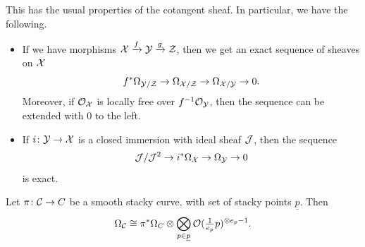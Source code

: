 \begin{rmk}
This has the usual properties of the cotangent sheaf. In particular, we have the following.
\begin{itemize}
	\item If we have morphisms $\mathcal{X} \xrightarrow{f} \mathcal{Y} \xrightarrow{g} \mathcal{Z}$, then we get an exact sequence of sheaves on $\mathcal{X}$
	\[
	f^* \Omega_{\mathcal{Y} / \mathcal{Z}} \to \Omega_{\mathcal{X} / \mathcal{Z}} \to \Omega_{\mathcal{X} / \mathcal{Y}} \to 0.
	\]
	Moreover, if $\mathcal{O}_{\mathcal{X}}$ is locally free over $f^{-1}\mathcal{O}_{\mathcal{Y}}$, then the sequence can be extended with $0$ to the left.
	
	\item If $i \colon \mathcal{Y} \to \mathcal{X}$ is a closed immersion with ideal sheaf $\mathcal{J}$, then the sequence
	\[
	\mathcal{J}/ \mathcal{J}^2 \to i^* \Omega_{\mathcal{X}} \to \Omega_{\mathcal{Y}} \to 0
	\]
	is exact.	
\end{itemize}
\end{rmk}

\begin{thm} \cite[Theorem 1.2.34]{Taams} \label{omega mc(X)}
Let $\pi \colon \mathcal{C} \to C$ be a smooth stacky curve, with set of stacky points $\underline{p}$. Then
\[
\Omega_{\mathcal{C}} \cong \pi^* \Omega_C \otimes \bigotimes_{p \in \underline{p}} \mathcal{O}(\tfrac{1}{e_p}p)^{\otimes e_p -1}.
\]
\end{thm}

